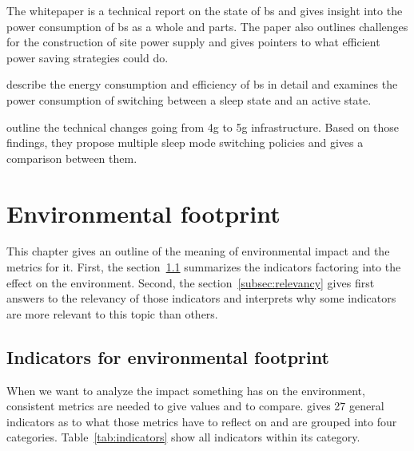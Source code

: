 \documentclass[11pt,a4paper]{article}
\begin{document}
The whitepaper \citep{powerwhitepaper} is a technical report on the state of \acrfull{bs} and gives insight into the power consumption of \acrshort{bs} as a whole and parts.
The paper also outlines challenges for the construction of site power supply and gives pointers to what efficient power saving strategies could do.

\citep{5GEfficiencyOverview} describe the energy consumption and efficiency of \acrshort{bs} in detail and examines the power consumption of switching between a sleep state and an active state.

\citep{DynamicSleepModeControl} outline the technical changes going from \acrshort{4g} to \acrfull{5g} infrastructure.
Based on those findings, they propose multiple sleep mode switching policies and gives a comparison between them.

\section{Environmental footprint}\label{sec:energyfootprint}
This chapter gives an outline of the meaning of environmental impact and the metrics for it.
First, the section~\ref{subsec:indicators} summarizes the indicators factoring into the effect on the environment.
Second, the section~\ref{subsec:relevancy} gives first answers to the relevancy of those indicators and interprets why some indicators are more relevant to this topic than others.

\subsection{Indicators for environmental footprint}\label{subsec:indicators}

When we want to analyze the impact something has on the environment, consistent metrics are needed to give values and to compare.
\citep{Umweltindikatoren} gives 27 general indicators as to what those metrics have to reflect on and are grouped into four categories.
Table~\ref{tab:indicators} show all indicators within its category.
\end{document}
